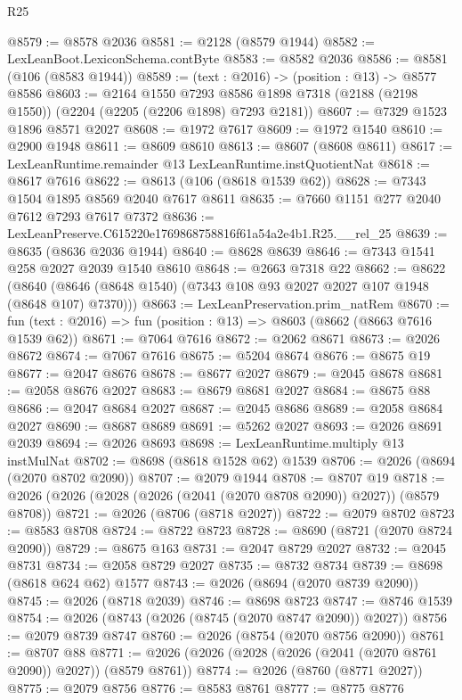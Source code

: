 \begin{lexlean}{R25}
\begin{coremodule}
@8579 := @8578 @2036
@8581 := @2128 (@8579 @1944)
@8582 := LexLeanBoot.LexiconSchema.contByte
@8583 := @8582 @2036
@8586 := @8581 (@106 (@8583 @1944))
@8589 := (text : @2016) -> (position : @13) -> @8577 @8586
@8603 := @2164
    @1550
    @7293
    @8586
    @1898
    @7318
    (@2188 (@2198 @1550))
    (@2204 (@2205 (@2206 @1898) @7293 @2181))
@8607 := @7329 @1523 @1896 @8571 @2027
@8608 := @1972 @7617
@8609 := @1972 @1540
@8610 := @2900 @1948
@8611 := @8609 @8610
@8613 := @8607 (@8608 @8611)
@8617 := LexLeanRuntime.remainder @13 LexLeanRuntime.instQuotientNat
@8618 := @8617 @7616
@8622 := @8613 (@106 (@8618 @1539 @62))
@8628 := @7343 @1504 @1895 @8569 @2040 @7617 @8611
@8635 := @7660 @1151 @277 @2040 @7612 @7293 @7617 @7372
@8636 := LexLeanPreserve.C615220e1769868758816f61a54a2e4b1.R25.__rel_25
@8639 := @8635 (@8636 @2036 @1944)
@8640 := @8628 @8639
@8646 := @7343 @1541 @258 @2027 @2039 @1540 @8610
@8648 := @2663 @7318 @22
@8662 := @8622
    (@8640 (@8646 (@8648 @1540) (@7343 @108 @93 @2027 @2027 @107 @1948 (@8648 @107) @7370)))
@8663 := LexLeanPreservation.prim_natRem
@8670 := fun (text : @2016) => fun (position : @13) => @8603 (@8662 (@8663 @7616 @1539 @62))
@8671 := @7064 @7616
@8672 := @2062 @8671
@8673 := @2026 @8672
@8674 := @7067 @7616
@8675 := @5204 @8674
@8676 := @8675 @19
@8677 := @2047 @8676
@8678 := @8677 @2027
@8679 := @2045 @8678
@8681 := @2058 @8676 @2027
@8683 := @8679 @8681 @2027
@8684 := @8675 @88
@8686 := @2047 @8684 @2027
@8687 := @2045 @8686
@8689 := @2058 @8684 @2027
@8690 := @8687 @8689
@8691 := @5262 @2027
@8693 := @2026 @8691 @2039
@8694 := @2026 @8693
@8698 := LexLeanRuntime.multiply @13 instMulNat
@8702 := @8698 (@8618 @1528 @62) @1539
@8706 := @2026 (@8694 (@2070 @8702 @2090))
@8707 := @2079 @1944
@8708 := @8707 @19
@8718 := @2026 (@2026 (@2028 (@2026 (@2041 (@2070 @8708 @2090)) @2027)) (@8579 @8708))
@8721 := @2026 (@8706 (@8718 @2027))
@8722 := @2079 @8702
@8723 := @8583 @8708
@8724 := @8722 @8723
@8728 := @8690 (@8721 (@2070 @8724 @2090))
@8729 := @8675 @163
@8731 := @2047 @8729 @2027
@8732 := @2045 @8731
@8734 := @2058 @8729 @2027
@8735 := @8732 @8734
@8739 := @8698 (@8618 @624 @62) @1577
@8743 := @2026 (@8694 (@2070 @8739 @2090))
@8745 := @2026 (@8718 @2039)
@8746 := @8698 @8723
@8747 := @8746 @1539
@8754 := @2026 (@8743 (@2026 (@8745 (@2070 @8747 @2090)) @2027))
@8756 := @2079 @8739 @8747
@8760 := @2026 (@8754 (@2070 @8756 @2090))
@8761 := @8707 @88
@8771 := @2026 (@2026 (@2028 (@2026 (@2041 (@2070 @8761 @2090)) @2027)) (@8579 @8761))
@8774 := @2026 (@8760 (@8771 @2027))
@8775 := @2079 @8756
@8776 := @8583 @8761
@8777 := @8775 @8776

\end{coremodule}
\end{lexlean}
